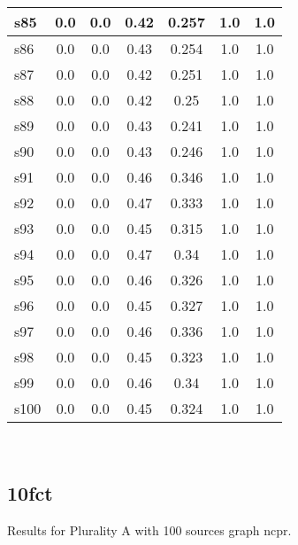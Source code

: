 \documentclass{article}
\begin{document}
\begin{tabular}{|l|c|c|c|c|c|c|}
\hline
s85 &0.0 & 0.0 & 0.42 & 0.257 & 1.0 & 1.0\\
\hline
s86 &0.0 & 0.0 & 0.43 & 0.254 & 1.0 & 1.0\\
\hline
s87 &0.0 & 0.0 & 0.42 & 0.251 & 1.0 & 1.0\\
\hline
s88 &0.0 & 0.0 & 0.42 & 0.25 & 1.0 & 1.0\\
\hline
s89 &0.0 & 0.0 & 0.43 & 0.241 & 1.0 & 1.0\\
\hline
s90 &0.0 & 0.0 & 0.43 & 0.246 & 1.0 & 1.0\\
\hline
s91 &0.0 & 0.0 & 0.46 & 0.346 & 1.0 & 1.0\\
\hline
s92 &0.0 & 0.0 & 0.47 & 0.333 & 1.0 & 1.0\\
\hline
s93 &0.0 & 0.0 & 0.45 & 0.315 & 1.0 & 1.0\\
\hline
s94 &0.0 & 0.0 & 0.47 & 0.34 & 1.0 & 1.0\\
\hline
s95 &0.0 & 0.0 & 0.46 & 0.326 & 1.0 & 1.0\\
\hline
s96 &0.0 & 0.0 & 0.45 & 0.327 & 1.0 & 1.0\\
\hline
s97 &0.0 & 0.0 & 0.46 & 0.336 & 1.0 & 1.0\\
\hline
s98 &0.0 & 0.0 & 0.45 & 0.323 & 1.0 & 1.0\\
\hline
s99 &0.0 & 0.0 & 0.46 & 0.34 & 1.0 & 1.0\\
\hline
s100 &0.0 & 0.0 & 0.45 & 0.324 & 1.0 & 1.0\\
\hline
\end{tabular}\\

\newpage

\subsection{10fct}

\noindent Results for Plurality A with 100 sources graph ncpr.
\end{document}
